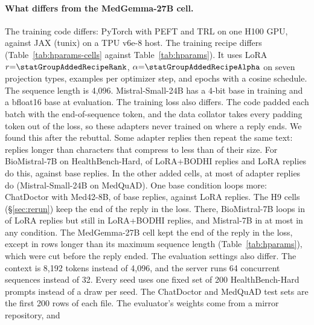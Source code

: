 \documentclass{article}
\newcommand{\hbhard}{HealthBench-Hard}
\begin{document}
\paragraph{What differs from the MedGemma-27B cell.} The training code differs: PyTorch with PEFT
and TRL on one H100 GPU, against JAX (tunix) on a TPU v6e-8 host. The training recipe differs
(Table~\ref{tab:hparams-cells} against Table~\ref{tab:hparams}). It uses LoRA
$r{=}\statGroupAddedRecipeRank$, $\alpha{=}\statGroupAddedRecipeAlpha$ on seven projection types,
\statGroupAddedRecipeEffectiveBatch{} examples per optimizer step, and \statGroupAddedRecipeEpochs{} epochs with a
cosine schedule. The sequence length is 4,096. Mistral-Small-24B has a 4-bit base in training and
a bfloat16 base at evaluation. The training loss also differs. The code padded each batch with the
end-of-sequence token, and the data collator takes every padding token out of the loss, so these
adapters never trained on where a reply ends. We found this after the rebuttal. Some adapter
replies then repeat the same text: replies longer than \statCrossCellsReplyLoopMinChars{} characters
that compress to less than \statCrossCellsReplyLoopMaxRatio{} of their size. For BioMistral-7B on
\hbhard{}, \statHBBioMistralJulLoopsLoRABodhi{} of \statHBBioMistralJulLoopsLoRABodhiN{} LoRA+BODHI replies
and \statHBBioMistralJulLoopsLoRA{} LoRA replies do this, against \statHBBioMistralJulLoopsBase{} base
replies. In the other added cells, at most \statMQMistralJulLoopsLoRA{} of
\statMQMistralJulLoopsLoRAN{} adapter replies do (Mistral-Small-24B on MedQuAD). One base condition
loops more: ChatDoctor with Med42-8B, \statCDMedFortyTwoJulLoopsBase{} of \statCDMedFortyTwoJulLoopsBaseN{} base
replies, against \statCDMedFortyTwoJulLoopsLoRA{} LoRA replies. The H9 cells (\S\ref{sec:rerun}) keep the
end of the reply in the loss. There, BioMistral-7B loops in \statHBBioMistralTeacherLoopsLoRA{} of
\statHBBioMistralTeacherLoopsLoRAN{} LoRA replies but still in \statHBBioMistralTeacherLoopsLoRABodhi{} LoRA+BODHI
replies, and Mistral-7B in at most \statHBMistralSevenLoopsLoRABodhi{} in any condition. The MedGemma-27B cell kept the end of the
reply in the loss, except in rows longer than its maximum sequence length
(Table~\ref{tab:hparams}), which were cut before the reply ended. The evaluation settings also differ. The context is 8,192 tokens
instead of 4,096, and the server runs 64 concurrent sequences instead of 32. Every seed uses one
fixed set of 200 \hbhard{} prompts instead of a draw per seed. The ChatDoctor and MedQuAD test sets
are the first 200 rows of each file. The evaluator's weights come from a mirror repository, and
\end{document}

